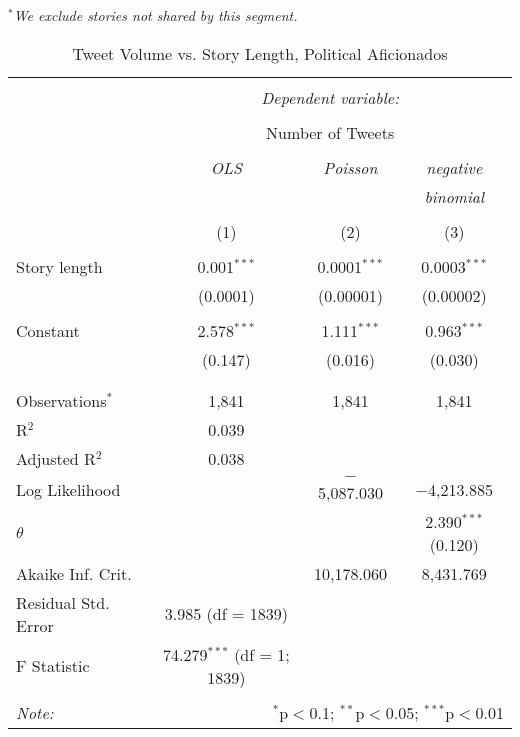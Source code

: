 \emph{$^{*}$We exclude stories not shared by this segment.} 
\newpage 
\begin{table}[!htbp] \centering 
  \caption{Tweet Volume vs. Story Length, Political Aficionados} 
  \label{} 
    \begin{tabular}{@{\extracolsep{5pt}}lccc} 
    \\[-1.8ex]\hline 
    \hline \\[-1.8ex] 
     & \multicolumn{3}{c}{\textit{Dependent variable:}} \\ 
    \cline{2-4} 
    \\[-1.8ex] & \multicolumn{3}{c}{Number of Tweets} \\ 
    \\[-1.8ex] & \textit{OLS} & \textit{Poisson} & \textit{negative} \\ 
     & \textit{} & \textit{} & \textit{binomial} \\ 
    \\[-1.8ex] & (1) & (2) & (3)\\ 
    \hline \\[-1.8ex] 
     Story length & 0.001$^{***}$ & 0.0001$^{***}$ & 0.0003$^{***}$ \\ 
      & (0.0001) & (0.00001) & (0.00002) \\ 
      & & & \\ 
     Constant & 2.578$^{***}$ & 1.111$^{***}$ & 0.963$^{***}$ \\ 
      & (0.147) & (0.016) & (0.030) \\ 
      & & & \\ 
    \hline \\[-1.8ex] 
    Observations$^{*}$ & 1,841 & 1,841 & 1,841 \\ 
    R$^{2}$ & 0.039 &  &  \\ 
    Adjusted R$^{2}$ & 0.038 &  &  \\ 
    Log Likelihood &  & $-$5,087.030 & $-$4,213.885 \\ 
    $\theta$ &  &  & 2.390$^{***}$  (0.120) \\ 
    Akaike Inf. Crit. &  & 10,178.060 & 8,431.769 \\ 
    Residual Std. Error & 3.985 (df = 1839) &  &  \\ 
    F Statistic & 74.279$^{***}$ (df = 1; 1839) &  &  \\ 
    \hline 
    \hline \\[-1.8ex] 
    \textit{Note:}  & \multicolumn{3}{r}{$^{*}$p$<$0.1; $^{**}$p$<$0.05; $^{***}$p$<$0.01} \\ 
    \end{tabular} 
\end{table}
